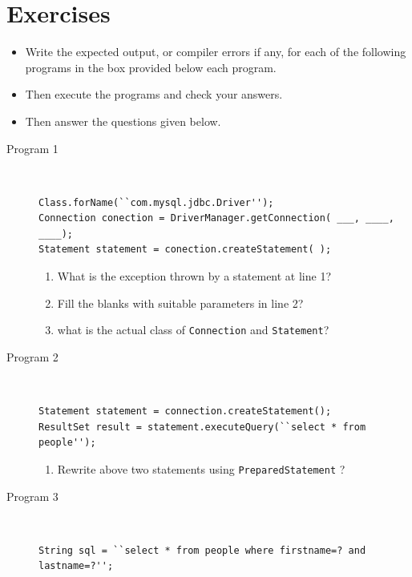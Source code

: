 \documentclass[11pt,a4paper]{article}
\def\AnswerBox{\fbox{\begin{minipage}{4in}\hfill\vspace{0.5in}\end{minipage}}}
\begin{document}
\section*{Exercises}
\begin{itemize}
\item Write the expected output, or compiler errors if any, for each of the following programs in the box provided below each program.
\item Then execute the programs and check your answers.
\item Then answer the questions given below.
\end{itemize}
\begin{description}
\item [Program 1]\
\begin{lstlisting}
Class.forName(``com.mysql.jdbc.Driver'');
Connection conection = DriverManager.getConnection( ___, ____, ____);
Statement statement = conection.createStatement( );
\end{lstlisting}

\AnswerBox

\begin{enumerate}[label=\bfseries Q\arabic*:]\itemsep10pt
\item What is the exception thrown by a statement at line 1?
\item Fill the blanks with suitable parameters in line 2?
\item what is the actual class of \texttt{Connection} and \texttt{Statement}?
\end{enumerate}

\item [Program 2]\
\begin{lstlisting}
Statement statement = connection.createStatement();
ResultSet result = statement.executeQuery(``select * from people'');
\end{lstlisting}

\AnswerBox

\begin{enumerate}[label=\bfseries Q\arabic*:]\itemsep10pt
\item Rewrite above two statements using \texttt{PreparedStatement} ?
\end{enumerate}

\item [Program 3]\
\begin{lstlisting}
String sql = ``select * from people where firstname=? and lastname=?'';
\end{lstlisting}


\end{description}
\end{document}
